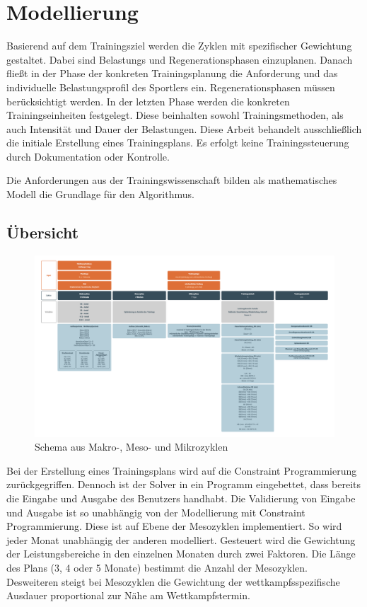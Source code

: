 \chapter{Modellierung}
\label{sec:modellierung}
Basierend auf dem Trainingsziel werden die Zyklen mit spezifischer Gewichtung gestaltet. Dabei sind Belastungs und Regenerationsphasen einzuplanen. Danach fließt in der Phase der konkreten Trainingsplanung die Anforderung und das individuelle Belastungsprofil des Sportlers ein. Regenerationsphasen müssen berücksichtigt werden. 
In der letzten Phase werden die konkreten Trainingseinheiten festgelegt. Diese beinhalten sowohl Trainingsmethoden, als auch Intensität und Dauer der Belastungen. 
Diese Arbeit behandelt ausschließlich die initiale Erstellung eines Trainingsplans. Es erfolgt keine Trainingssteuerung durch Dokumentation oder Kontrolle.

Die Anforderungen aus der Trainingswissenschaft bilden als mathematisches Modell die Grundlage für den Algorithmus. 

\section{Übersicht}
\label{sec:modellierung:uebersicht}
    \begin{figure}[tbh]
    	\includegraphics[width=\textwidth]{gfx/modell.png}
    	\caption{Schema aus Makro-, Meso- und Mikrozyklen}
    	\label{fig:modellierung:schema}
    \end{figure}
Bei der Erstellung eines Trainingsplans wird auf die Constraint Programmierung zurückgegriffen. Dennoch ist der Solver in ein Programm eingebettet, dass bereits die Eingabe und Ausgabe des Benutzers handhabt. Die Validierung von Eingabe und Ausgabe ist so unabhängig von der Modellierung mit Constraint Programmierung. Diese ist auf Ebene der Mesozyklen implementiert. So wird jeder Monat unabhängig der anderen modelliert. Gesteuert wird die Gewichtung der Leistungsbereiche in den einzelnen Monaten durch zwei Faktoren. Die Länge des Plans (3, 4 oder 5 Monate) bestimmt die Anzahl der Mesozyklen. Desweiteren steigt bei Mesozyklen die Gewichtung der wettkampfsspezifische Ausdauer proportional  zur Nähe am Wettkampfstermin.


